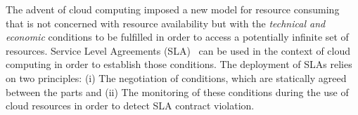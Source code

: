 


The advent of cloud computing imposed a new model for resource consuming that is not concerned
 with resource availability but with the \textit{technical and economic} conditions to be fulfilled in order to access a potentially infinite set of resources. 
Service Level Agreements (SLA)~\cite{SLA} can be used in the context of cloud computing in order to establish those conditions. The deployment of SLAs relies on two principles: (i) The negotiation of conditions, which are statically agreed between the parts and (ii) The monitoring of these conditions during the use of cloud resources in order to detect SLA contract violation.

